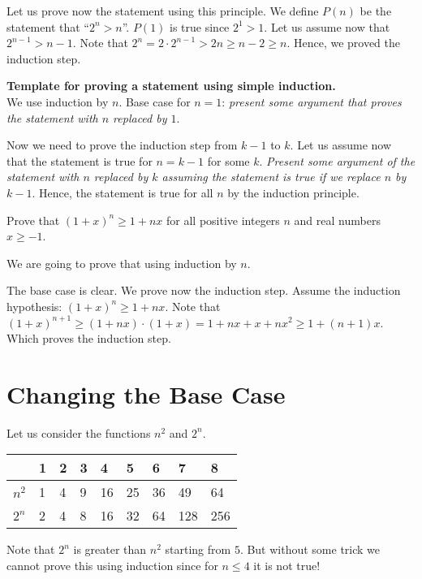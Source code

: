 Let us prove now the statement using this principle.
We define $P(n)$ be the statement that ``$2^n > n$''.
$P(1)$ is true since $2^1 > 1$. Let us assume now that $2^{n - 1} > n - 1$. Note
that $2^n = 2 \cdot 2^{n - 1} > 2n \ge n - 2 \ge n$. Hence, we proved the
induction step.


\begin{template}
  \textbf{Template for proving a statement using simple induction.} \\

  We use induction by $n$. Base case for $n = 1$: \emph{present some argument 
  that proves the statement with $n$ replaced by $1$}. 

  Now we need to prove the induction step from $k - 1$ to $k$. Let us assume now
  that the statement is true for $n = k - 1$ for some $k$. \emph{Present some
  argument of the statement with $n$ replaced by $k$ assuming the statement is
  true if we replace $n$ by $k - 1$}. Hence, the statement is true for all $n$
  by the induction principle.
\end{template}


\begin{exercise}
  Prove that $(1 + x)^n \ge 1 + nx$ for all positive integers $n$ and real
  numbers $x \ge -1$.
\end{exercise}
\begin{solution}
  We are going to prove that using induction by $n$.

  The base case is clear. We prove now the induction step. Assume the
  induction hypothesis: $(1 + x)^n \ge 1 + nx$. Note that  $(1 + x)^{n + 1} \ge
  (1 + nx) \cdot (1 + x) = 1 + nx + x + nx^2 \ge 1 + (n + 1)x$. Which proves the
  induction step.
\end{solution}

\section{Changing the Base Case}
Let us consider the functions $n^2$ and $2^n$.

\begin{center}
    \begin{tabular}{l  l  l  l  l  l  l  l  l}
        \toprule
              & 1 & 2 & 3 & 4  & 5  & 6  & 7   & 8   \\
        \midrule
        $n^2$ & 1 & 4 & 9 & 16 & 25 & 36 & 49  & 64  \\
        $2^n$ & 2 & 4 & 8 & 16 & 32 & 64 & 128 & 256 \\
        \bottomrule
    \end{tabular}
\end{center}
Note that $2^n$ is greater than $n^2$ starting from $5$. But without some trick
we cannot prove this using induction since for $n \le 4$ it is not true!

